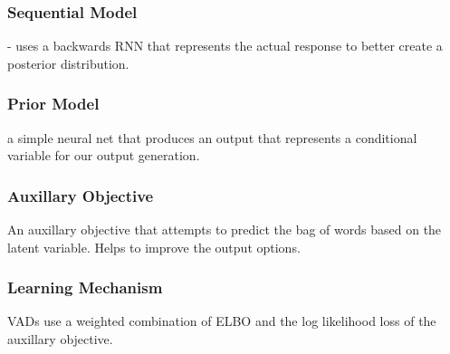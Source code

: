 \documentclass[12pt,twoside]{report}
\begin{document}
\subsubsection{Sequential Model}

- uses a backwards RNN that represents the actual response to better create a posterior distribution.

\subsubsection{Prior Model}

a simple neural net that produces an output that represents a conditional variable for our output generation.

\subsubsection{Auxillary Objective}

An auxillary objective that attempts to predict the bag of words based on the latent variable. Helps to improve the output options.

\subsubsection{Learning Mechanism}

VADs use a weighted combination of ELBO and the log likelihood loss of the auxillary objective.










 
\end{document}
